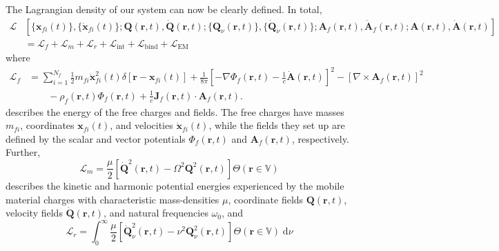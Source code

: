 \documentclass{article}
\begin{document}
The Lagrangian density of our system can now be clearly defined. In total,
\begin{equation}\label{eq:lagrangianDensityMQED}
\begin{split}
\mathcal{L}&\left[\{\mathbf{x}_{fi}(t)\},\{\dot{\mathbf{x}}_{fi}(t)\};\mathbf{Q}(\mathbf{r},t),\dot{\mathbf{Q}}(\mathbf{r},t);\{\mathbf{Q}_\nu(\mathbf{r},t)\},\{\dot{\mathbf{Q}}_\nu(\mathbf{r},t)\};\mathbf{A}_f(\mathbf{r},t),\dot{\mathbf{A}}_f(\mathbf{r},t);\mathbf{A}(\mathbf{r},t),\dot{\mathbf{A}}(\mathbf{r},t)\right]\\
&= \mathcal{L}_f + \mathcal{L}_m + \mathcal{L}_r + \mathcal{L}_\mathrm{int} + \mathcal{L}_\mathrm{bind} + \mathcal{L}_\mathrm{EM}
\end{split}
\end{equation}
where
\begin{equation}
\begin{split}
\mathcal{L}_f &= \sum_{i = 1}^{N_f}\frac{1}{2}m_{fi}\dot{\mathbf{x}}_{fi}^2(t)\delta[\mathbf{r} - \mathbf{x}_{fi}(t)] + \frac{1}{8\pi}\left[-\nabla\Phi_f(\mathbf{r},t) - \frac{1}{c}\dot{\mathbf{A}}(\mathbf{r},t)\right]^2 - \left[\nabla\times\mathbf{A}_f(\mathbf{r},t)\right]^2\\
&\qquad - \rho_f(\mathbf{r},t)\Phi_f(\mathbf{r},t) + \frac{1}{c}\mathbf{J}_f(\mathbf{r},t)\cdot\mathbf{A}_f(\mathbf{r},t).
\end{split}
\end{equation}
describes the energy of the free charges and fields. The free charges have masses $m_{fi}$, coordinates $\mathbf{x}_{fi}(t)$, and velocities $\dot{\mathbf{x}}_{fi}(t)$, while the fields they set up are defined by the scalar and vector potentials $\Phi_f(\mathbf{r},t)$ and $\mathbf{A}_f(\mathbf{r},t)$, respectively. Further,
\begin{equation}\label{eq:lagrangianDensityM}
\mathcal{L}_m = \frac{\mu}{2}\left[\dot{\mathbf{Q}}^2(\mathbf{r},t) - \Omega^2\mathbf{Q}^2(\mathbf{r},t)\right]\Theta(\mathbf{r}\in\mathbb{V})
\end{equation}
describes the kinetic and harmonic potential energies experienced by the mobile material charges with characteristic mass-densities $\mu$, coordinate fields $\mathbf{Q}(\mathbf{r},t)$, velocity fields $\dot{\mathbf{Q}}(\mathbf{r},t)$, and natural frequencies $\omega_0$, and
\begin{equation}
\mathcal{L}_r = \int_0^\infty\frac{\mu}{2}\left[\dot{\mathbf{Q}}_\nu^2(\mathbf{r},t) - \nu^2\mathbf{Q}_\nu^2(\mathbf{r},t)\right]\Theta(\mathbf{r}\in\mathbb{V})\;\mathrm{d}\nu
\end{equation}
\end{document}

